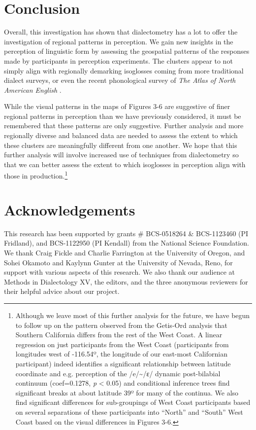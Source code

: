 \documentclass[output=paper]{LSP/langsci}
\begin{document}
\section{Conclusion}
Overall, this investigation has shown that dialectometry has a lot to offer the investigation of regional patterns in perception. We gain new insights in the perception of linguistic form by assessing the geospatial patterns of the responses made by participants in perception experiments. The clusters appear to not simply align with regionally demarking isoglosses coming from more traditional dialect surveys, or even the recent phonological survey of \textit{The Atlas of North American English} \citep{labov_atlas_2006-1}.

While the visual patterns in the maps of Figures 3-6 are suggestive of finer regional patterns in perception than we have previously considered, it must be remembered that these patterns are only suggestive. Further analysis and more regionally diverse and balanced data are needed to assess the extent to which these clusters are meaningfully different from one another. We hope that this further analysis will involve increased use of techniques from dialectometry so that we can better assess the extent to which isoglosses in perception align with those in production.\footnote{Although we leave most of this further analysis for the future, we have begun to follow up on the pattern observed from the Getis-Ord analysis that Southern California differs from the rest of the West Coast. A linear regression on just participants from the West Coast (participants from longitudes west of -116.54º, the longitude of our east-most Californian participant) indeed identifies a significant relationship between latitude coordinate and e.g. perception of the /e/{\textasciitilde}/ɛ/ dynamic post-bilabial continuum (coef=0.1278, \textit{p} {\textless} 0.05) and conditional inference trees find significant breaks at about latitude 39º for many of the continua. We also find significant differences for sub-groupings of West Coast participants based on several separations of these participants into “North” and “South” West Coast based on the visual differences in Figures 3-6.}

\section*{Acknowledgements}
This research has been supported by grants \# BCS-0518264 \& BCS-1123460 (PI Fridland), and BCS-1122950 (PI Kendall) from the National Science Foundation. We thank Craig Fickle and Charlie Farrington at the University of Oregon, and Sohei Okamoto and Kaylynn Gunter at the University of Nevada, Reno, for support with various aspects of this research. We also thank our audience at Methods in Dialectology XV, the editors, and the three anonymous reviewers for their helpful advice about our project.

\printbibliography[heading=subbibliography,notkeyword=this]
\end{document}

